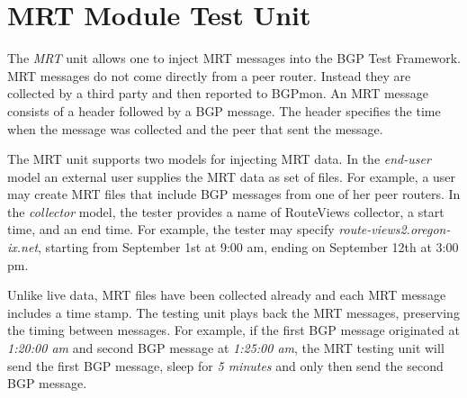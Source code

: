 \section{MRT Module Test Unit}
\label{sec:mrt}


The \emph{MRT} unit allows one to inject MRT messages into the BGP Test Framework.  MRT messages do not come directly from a peer router. Instead they are collected by a third party and then reported to BGPmon.    An MRT message consists of a header followed by a BGP message. The header specifies the time when the message was collected and the peer that sent the message. 

 
The MRT unit supports two models for injecting MRT data. In the \emph{end-user} model an external user supplies the MRT data as set of files.   For example, a user may create MRT files that include BGP messages from one of her peer routers.  In the \emph{collector}
model, the tester provides a name of  RouteViews collector, a start time, and an end time.  For example, the tester may specify \emph{route-views2.oregon-ix.net}, starting from September 1st at 9:00 am, ending on September 12th at 3:00 pm. 
  
 

Unlike live data,  MRT files  have been collected already and each MRT message includes a time stamp. The testing  unit plays back the MRT messages, preserving the timing between messages.  For example, if the first BGP message originated at \emph{1:20:00 am} and second BGP message at \emph{1:25:00 am},  the MRT testing unit will send the first BGP message, sleep for \emph{5 minutes} and only then send the second BGP message. 

